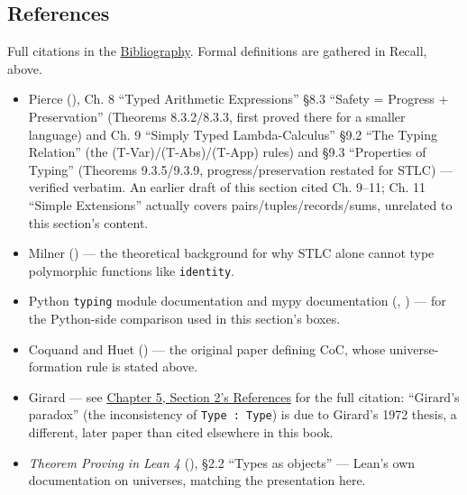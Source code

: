 \subsection{References}\label{sec:05-rigor-check:03-typing-rules-and-safety:8}

Full citations in the \hyperref[sec:root:bibliography:1]{Bibliography}. Formal definitions are gathered in Recall, above.

\begin{itemize}
\tightlist
\item
  Pierce (\cite{Pierce2002}), Ch. 8 ``Typed Arithmetic Expressions'' §8.3 ``Safety = Progress + Preservation'' (Theorems 8.3.2/8.3.3, first proved there for a smaller language) and Ch. 9 ``Simply Typed Lambda-Calculus'' §9.2 ``The Typing Relation'' (the (T-Var)/(T-Abs)/(T-App) rules) and §9.3 ``Properties of Typing'' (Theorems 9.3.5/9.3.9, progress/preservation restated for STLC) --- verified verbatim. An earlier draft of this section cited Ch. 9--11; Ch. 11 ``Simple Extensions'' actually covers pairs/tuples/records/sums, unrelated to this section's content.
\item
  Milner (\cite{Milner1978}) --- the theoretical background for why STLC alone cannot type polymorphic functions like \texttt{identity}.
\item
  Python \texttt{typing} module documentation and mypy documentation (\cite{PythonTyping}, \cite{MypyDocs}) --- for the Python-side comparison used in this section's boxes.
\item
  Coquand and Huet (\cite{CoquandHuet1988}) --- the original paper defining CoC, whose universe-formation rule is stated above.
\item
  Girard --- see \hyperref[sec:05-rigor-check:02-universes:1]{Chapter 5, Section 2's References} for the full citation: ``Girard's paradox'' (the inconsistency of \texttt{Type : Type}) is due to Girard's 1972 thesis, a different, later paper than \cite{Girard1971} cited elsewhere in this book.
\item
  \emph{Theorem Proving in Lean 4} (\cite{TPIL4}), §2.2 ``Types as objects'' --- Lean's own documentation on universes, matching the presentation here.
\end{itemize}
